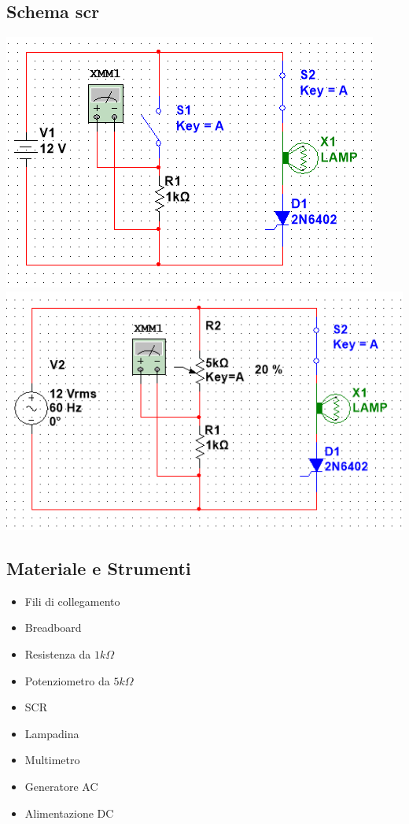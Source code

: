 \documentclass[12pt]{article}
\begin{document}
    \subsection{Schema scr} \label{Schema scr}
\begin{flushleft}
    \includegraphics[scale=0.8]{schema-scr-A}
    \includegraphics[scale=0.8]{schema-scr-B}
\end{flushleft}
    \subsection{Materiale e Strumenti}
    \begin{multicols}{2}
    \begin{itemize}
    \item Fili di collegamento
    \item Breadboard
    \item Resistenza da $1k\Omega$
    \item Potenziometro da $5k\Omega$
    \item SCR \textit{}
    \item Lampadina
    \end{itemize}
    \vfill\null
    \columnbreak
    \begin{itemize}
    \item Multimetro
    \item Generatore AC
    \item Alimentazione DC 
    \end{itemize}
    \vfill\null
    \end{multicols}
\end{document}
